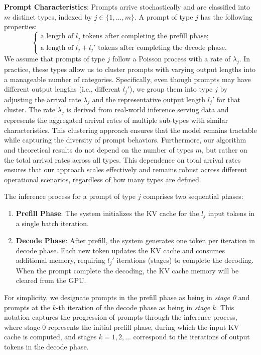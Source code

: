 \textbf{Prompt Characteristics}: Prompts arrive stochastically and are classified into \( m \) distinct types, indexed by \( j \in \{1, \dots, m\} \). A prompt of type \( j \) has the following properties:
\[
\begin{cases}
\text{a length of } l_j \text{ tokens after completing the prefill phase;} \\
\text{a length of } l_j + l_j' \text{ tokens after completing the decode phase.}
\end{cases}
\]
We assume that prompts of type \( j \) follow a Poisson process with a rate of \( \lambda_j \). In practice, these types allow us to cluster prompts with varying output lengths into a manageable number of categories. Specifically, even though prompts may have different output lengths (i.e., different \( l_j' \)), we group them into type \( j \) by adjusting the arrival rate \( \lambda_j \) and the representative output length \( l_j' \) for that cluster. The rate \( \lambda_j \) is derived from real-world inference serving data and represents the aggregated arrival rates of multiple sub-types with similar characteristics. This clustering approach ensures that the model remains tractable while capturing the diversity of prompt behaviors. Furthermore, our algorithm and theoretical results do not depend on the number of types \( m \), but rather on the total arrival rates across all types. This dependence on total arrival rates ensures that our approach scales effectively and remains robust across different operational scenarios, regardless of how many types are defined.

The inference process for a prompt of type \( j \) comprises two sequential phases:
\begin{enumerate}
    \item \textbf{Prefill Phase}: The system initializes the KV cache for the \( l_j \) input tokens in a single batch iteration.  
    
    \item \textbf{Decode Phase}: After prefill, the system generates one token  per iteration in decode phase. Each new token updates the KV cache and consumes additional memory, requiring \( l_j' \) iterations (stages) to complete the decoding. When the prompt complete the decoding, the KV cache memory will be cleared from the GPU.
\end{enumerate}
For simplicity, we designate prompts in the prefill phase as being in \textit{stage 0} and prompts at the \( k \)-th iteration of the decode phase as being in \textit{stage \( k \)}. This notation captures the progression of prompts through the inference process, where stage 0 represents the initial prefill phase, during which the input KV cache is computed, and stages \( k = 1, 2, \dots \) correspond to the iterations of output tokens in the decode phase.

